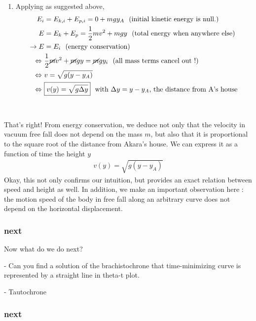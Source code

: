 \documentclass{article}
\begin{document}
\begin{tcolorbox}
\begin{enumerate}
\item Applying as suggested above,
\begin{align}
E_i &= E_{k,i} + E_{p,i}  = 0 + mgy_A ~~\text{(initial kinetic energy is null.)}\nonumber\\
E &= E_{k} + E_{p} = \frac 12  mv^2 + m g y ~~\text{(total energy when anywhere else)}\nonumber\\
\rightarrow E &= E_i \nonumber~~\text{(energy conservation)} \\
\Leftrightarrow~& \frac 12  \cancel{m}v^2 + \cancel{m} g y = \cancel{m}gy_i~~\text{(all mass terms cancel out !)}\nonumber \\
\Leftrightarrow~& v = \sqrt{g (y - y_A)}\nonumber\\
\Leftrightarrow~& \boxed{v(y) = \sqrt{g \Delta y}}\nonumber ~~\text{with $\Delta y=y - y_A$, the distance from A's house}
\end{align}

\end{enumerate}
\end{tcolorbox}
~

That's right! From energy conservation, we deduce not only that the velocity in vacuum free fall does not depend on the mass $m$, but also that it is proportional to the square root of the distance from Akara's house. We can express it as a function of time the height $y$
\begin{align}
  \boxed{v(y) = \sqrt{g (y - y_A)}}
\end{align}
Okay, this not only confirms our intuition, but provides an exact relation between speed and height as well. In addition, we make an important observation here : the motion speed of the body in free fall along an arbitrary curve does not depend on the horizontal displacement.

\subsubsection*{next}




Now what do we do next?


- Can you find a solution of the brachistochrone that time-minimizing curve is represented by a straight line in theta-t plot.

- Tautochrone


\subsubsection*{next}
\end{document}
